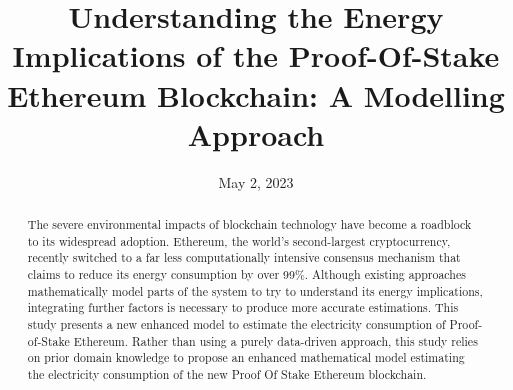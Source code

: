 \documentclass[sotoncolour]{uosthesis}      %
\title      {Understanding the Energy Implications of the Proof-Of-Stake Ethereum Blockchain: A Modelling Approach}
\date       {May 2, 2023}
\begin{document}

\justifying                  %
\frontmatter
\maketitle
\restoregeometry
\begin{abstract}
    The severe environmental impacts of blockchain technology have become a roadblock to its widespread adoption.  Ethereum, the world's second-largest cryptocurrency, recently switched to a far less computationally intensive consensus mechanism that claims to reduce its energy consumption by over 99\%. Although existing approaches mathematically model parts of the system to try to understand its energy implications, integrating further factors is necessary to produce more accurate estimations. This study presents a new enhanced model to estimate the electricity consumption of Proof-of-Stake Ethereum. Rather than using a purely data-driven approach, this study relies on prior domain knowledge to propose an enhanced mathematical model estimating the electricity consumption of the new Proof Of Stake Ethereum blockchain.   
\end{abstract}


\tableofcontents
\listoffigures
\listoftables
\end{document}
